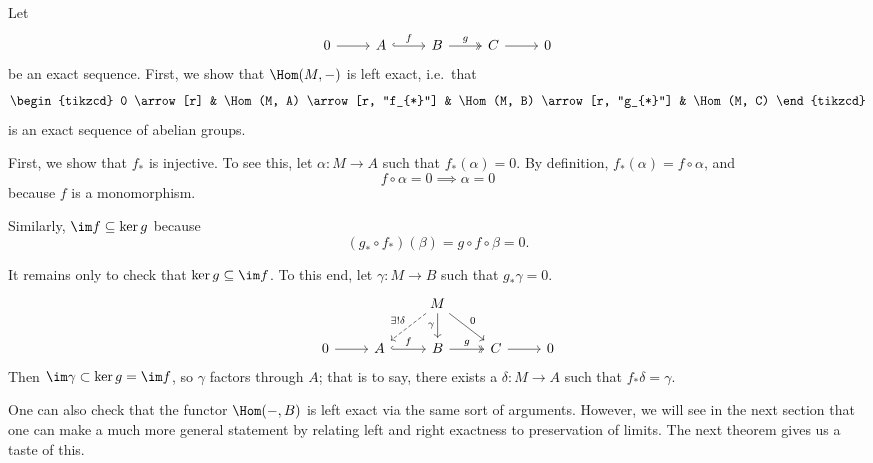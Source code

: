 \documentclass[main.tex]{subfiles}
\begin{document}
\begin{example}
  Let
  \begin{equation*}
    \begin{tikzcd}
      0
      \arrow[r]
      & A
      \arrow[r, hookrightarrow, "f"]
      & B
      \arrow[r, twoheadrightarrow, "g"]
      & C
      \arrow[r]
      & 0
    \end{tikzcd}
  \end{equation*}
  be an exact sequence. First, we show that $\Hom(M, -)$ is left exact, i.e.\ that
  \begin{equation*}
    \begin{tikzcd}
      0
      \arrow[r]
      & \Hom(M, A)
      \arrow[r, "f_{*}"]
      & \Hom(M, B)
      \arrow[r, "g_{*}"]
      & \Hom(M, C)
    \end{tikzcd}
  \end{equation*}
  is an exact sequence of abelian groups.

  First, we show that $f_{*}$ is injective. To see this, let $\alpha\colon M \to A$ such that $f_{*}(\alpha) = 0$. By definition, $f_{*}(\alpha) = f \circ \alpha$, and 
  \begin{equation*}
    f \circ \alpha = 0 \implies \alpha = 0
  \end{equation*}
  because $f$ is a monomorphism.

  Similarly, $\im f \subseteq \ker g$ because
  \begin{equation*}
    (g_{*} \circ f_{*})(\beta) = g \circ f \circ \beta = 0.
  \end{equation*}

  It remains only to check that $\ker g \subseteq \im f$. To this end, let $\gamma\colon M \to B$ such that $g_{*}\gamma = 0$.
  \begin{equation*}
    \begin{tikzcd}
      && M
      \arrow[d, swap, "\gamma"]
      \arrow[dr, "0"]
      \arrow[dl, swap, dashed, "\exists!\delta"]
      \\
      0
      \arrow[r]
      & A
      \arrow[r, hookrightarrow, "f"]
      & B
      \arrow[r, twoheadrightarrow, "g"]
      & C
      \arrow[r]
      & 0
    \end{tikzcd}
  \end{equation*}
  Then $\im \gamma \subset \ker g = \im f$, so $\gamma$ factors through $A$; that is to say, there exists a $\delta\colon M \to A$ such that $f_{*}\delta = \gamma$.
\end{example}

One can also check that the functor $\Hom(-, B)$ is left exact via the same sort of arguments. However, we will see in the next section that one can make a much more general statement by relating left and right exactness to preservation of limits. The next theorem gives us a taste of this.
\end{document}

